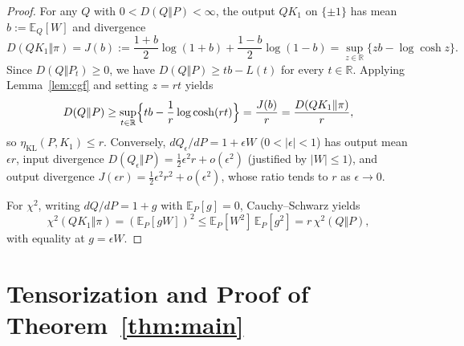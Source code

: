 \documentclass[11pt]{article}
\theoremstyle{plain}
\theoremstyle{definition}
\theoremstyle{remark}
\begin{document}
\begin{proof}
For any $Q$ with $0 < D(Q \Vert P) < \infty$, the output $QK_1$ on $\{\pm 1\}$ has mean $b := \mathbb{E}_Q[W]$ and divergence
\[
D(QK_1 \Vert \pi)
= J(b) := \frac{1+b}{2}\log(1+b) + \frac{1-b}{2}\log(1-b)
= \sup_{z \in \mathbb{R}} \{zb - \log\cosh z\}.
\]
Since $D(Q \Vert P_t) \ge 0$, we have $D(Q \Vert P) \ge tb - L(t)$ for every $t \in \mathbb{R}$. Applying Lemma~\ref{lem:cgf} and setting $z = rt$ yields
\[
D(Q \Vert P)
\ge \sup_{t \in \mathbb{R}} \Bigl\{tb - \frac{1}{r}\log\cosh(rt)\Bigr\}
= \frac{J(b)}{r} = \frac{D(QK_1 \Vert \pi)}{r},
\]
so $\eta_{\mathrm{KL}}(P, K_1) \le r$. Conversely, $dQ_\epsilon/dP = 1 + \epsilon W$ ($0 < |\epsilon| < 1$) has output mean $\epsilon r$, input divergence $D(Q_\epsilon \Vert P) = \frac{1}{2}\epsilon^2 r + o(\epsilon^2)$ (justified by $|W| \le 1$), and output divergence $J(\epsilon r) = \frac{1}{2}\epsilon^2 r^2 + o(\epsilon^2)$, whose ratio tends to $r$ as $\epsilon \to 0$.

For $\chi^2$, writing $dQ/dP = 1 + g$ with $\mathbb{E}_P[g] = 0$, Cauchy--Schwarz yields
\[
\chi^2(QK_1 \Vert \pi) = (\mathbb{E}_P[gW])^2 \le \mathbb{E}_P[W^2]\,\mathbb{E}_P[g^2] = r\,\chi^2(Q \Vert P),
\]
with equality at $g = \epsilon W$.
\end{proof}

\section{Tensorization and Proof of Theorem~\ref{thm:main}}
\end{document}
